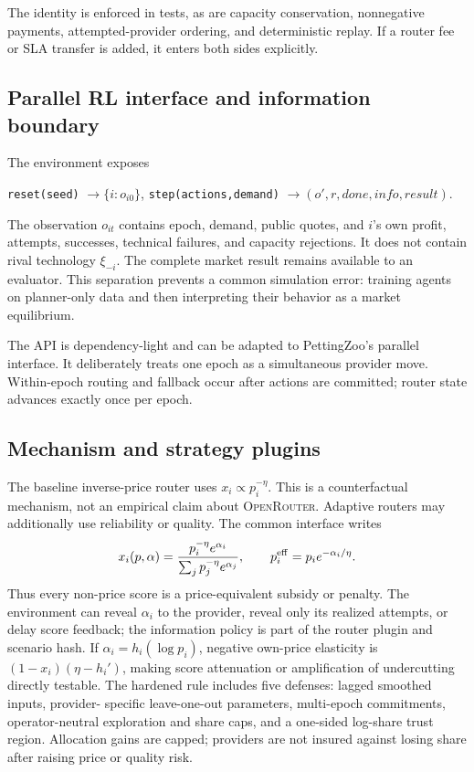 \documentclass[10pt]{article}
\newcommand{\1}{\mathbf 1}
\newcommand{\OR}{\textsc{OpenRouter}}
\begin{document}
The identity is enforced in tests, as are capacity conservation, nonnegative
payments, attempted-provider ordering, and deterministic replay.  If a router fee
or SLA transfer is added, it enters both sides explicitly.

\subsection{Parallel RL interface and information boundary}

The environment exposes
\begin{center}
\texttt{reset(seed)} $\to \{i:o_{i0}\}$,\qquad
\texttt{step(actions,demand)} $\to (o',r,done,info,result)$.
\end{center}
The observation $o_{it}$ contains epoch, demand, public quotes, and $i$'s own
profit, attempts, successes, technical failures, and capacity rejections.  It
does not contain rival technology $\xi_{-i}$.  The complete market result remains
available to an evaluator.  This separation prevents a common simulation error:
training agents on planner-only data and then interpreting their behavior as a
market equilibrium.

The API is dependency-light and can be adapted to PettingZoo's parallel
interface.  It deliberately treats one epoch as a simultaneous provider move.
Within-epoch routing and fallback occur after actions are committed; router state
advances exactly once per epoch.

\subsection{Mechanism and strategy plugins}

The baseline inverse-price router uses
$x_i\propto p_i^{-\eta}$.  This is a counterfactual mechanism, not an empirical
claim about \OR.  Adaptive routers may additionally use reliability or quality.
The common interface writes
\begin{equation}
x_i(p,\alpha)=
\frac{p_i^{-\eta}e^{\alpha_i}}{\sum_jp_j^{-\eta}e^{\alpha_j}},
\qquad
p_i^{\rm eff}=p_i e^{-\alpha_i/\eta}.
\label{eq:price-score}
\end{equation}
Thus every non-price score is a price-equivalent subsidy or penalty.  The
environment can reveal $\alpha_i$ to the provider, reveal only its realized
attempts, or delay score feedback; the information policy is part of the router
plugin and scenario hash.  If $\alpha_i=h_i(\log p_i)$, negative own-price
elasticity is $(1-x_i)(\eta-h_i')$, making score attenuation or amplification
of undercutting directly testable.
The hardened rule includes five defenses: lagged smoothed inputs, provider-
specific leave-one-out parameters, multi-epoch commitments, operator-neutral
exploration and share caps, and a one-sided log-share trust region.  Allocation
gains are capped; providers are not insured against losing share after raising
price or quality risk.
\end{document}
